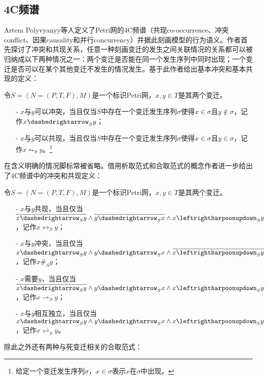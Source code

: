 \subsection{4C频谱}\label{subsec:4c}
Artem Polyvyanyy等人定义了Petri网的4C频谱（共现co-occurrence、冲突conflict、因果causality和并行concurrency）并据此刻画模型的行为语义\cite{polyvyanyy20144c}。作者首先探讨了冲突和共现关系，任意一种刻画变迁的发生之间关联情况的关系都可以被归纳成以下两种情况之一：两个变迁是否能在同一个发生序列中同时出现；一个变迁是否可以在某个其他变迁不发生的情况发生。基于此作者给出基本冲突和基本共现的定义：
\begin{definition}[基本冲突和基本共现]
令$S=(N=(P,T,F),M)$是一个标识Petri网，$x,y\in T$是其两个变迁。
  \begin{itemize}
    \item[-] $x$与$y$可以冲突，当且仅当$S$中存在一个变迁发生序列$\sigma$使得$x\in\sigma$且$y\notin\sigma$，记作$x\dashedrightarrow_{S}y$；
    \item[-] $x$与$y$可以共现，当且仅当$S$中存在一个变迁发生序列$\sigma$使得$x\in\sigma$且$y\in\sigma$，记作$x\leftrightharpoonupdown_{S}y$。\footnote{给定一个变迁发生序列$\sigma$，$x\in\sigma$表示$x$在$\sigma$中出现。}
  \end{itemize}
\end{definition}
在含义明确的情况脚标常被省略。借用析取范式和合取范式的概念作者进一步给出了4C频谱中的冲突和共现定义：
\begin{definition}[冲突和共现]
令$S=(N=(P,T,F),M)$是一个标识Petri网，$x,y\in T$是其两个变迁。
  \begin{itemize}
    \item[-] $x$与$y$共现，当且仅当$\overline{x\dashedrightarrow_{S}y}\wedge\overline{y\dashedrightarrow_{S}x}\wedge x\leftrightharpoonupdown_{S}y$，记作$x\leftrightarrow_{S}y$；
    \item[-] $x$与$y$冲突，当且仅当$x\dashedrightarrow_{S}y\wedge y\dashedrightarrow_{S}x\wedge\overline{x\leftrightharpoonupdown_{S}y}$，记作$x\#_{S}y$；
    \item[-] $x$需要$y$，当且仅当$\overline{x\dashedrightarrow_{S}y}\wedge y\dashedrightarrow_{S}x\wedge x\leftrightharpoonupdown_{S}y$，记作$x\rightharpoonup_{S}y$；
    \item[-] $x$与$y$相互独立，当且仅当$x\dashedrightarrow_{S}y\wedge y\dashedrightarrow_{S}x\wedge x\leftrightharpoonupdown_{S}y$，记作$x\rightleftharpoons_{S}y$。
  \end{itemize}
\end{definition}
除此之外还有两种与死变迁相关的合取范式：
